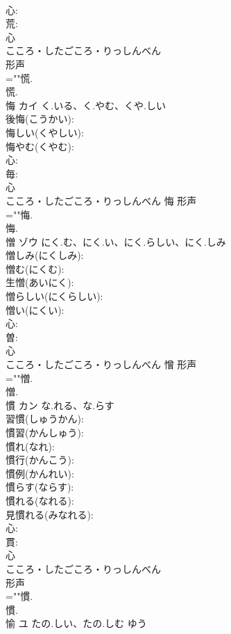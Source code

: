 \documentclass[8pt]{extreport}
\begin{document}
\begin{CJK}{UTF8}{min}
\\	心: 
\\	荒: 
\\	心	
\\	こころ・したごころ・りっしんべん	
\\	形声 
\\	=""慌.
\\	慌.
\\	悔	カイ	く.いる、く.やむ、くや.しい		
\\	後悔(こうかい): 
\\	悔しい(くやしい): 
\\	悔やむ(くやむ): 
\\	心: 
\\	毎: 
\\	心	
\\	こころ・したごころ・りっしんべん	悔	形声 
\\	=""悔.
\\	悔.
\\	憎	ゾウ	にく.む、にく.い、にく.らしい、にく.しみ		
\\	憎しみ(にくしみ): 
\\	憎む(にくむ): 
\\	生憎(あいにく): 
\\	憎らしい(にくらしい): 
\\	憎い(にくい): 
\\	心: 
\\	曽: 
\\	心	
\\	こころ・したごころ・りっしんべん	憎	形声 
\\	=""憎.
\\	憎.
\\	慣	カン	な.れる、な.らす		
\\	習慣(しゅうかん): 
\\	慣習(かんしゅう): 
\\	慣れ(なれ): 
\\	慣行(かんこう): 
\\	慣例(かんれい): 
\\	慣らす(ならす): 
\\	慣れる(なれる): 
\\	見慣れる(みなれる): 
\\	心: 
\\	貫: 
\\	心	
\\	こころ・したごころ・りっしんべん	
\\	形声 
\\	=""慣.
\\	慣.
\\	愉	ユ	たの.しい、たの.しむ	ゆう	

\end{CJK}
\end{document}
